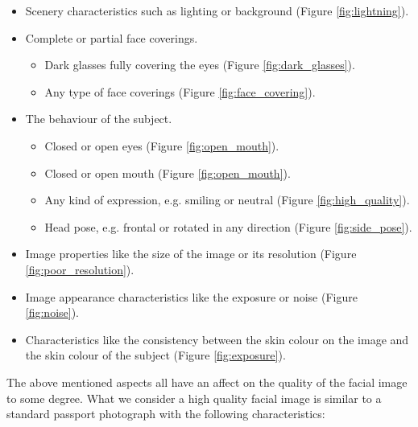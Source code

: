 \begin{itemize}
    \item Scenery characteristics such as lighting or background (Figure \ref{fig:lightning}).
    \item Complete or partial face coverings.
    \begin{itemize}
        \item Dark glasses fully covering the eyes (Figure \ref{fig:dark_glasses}).
        \item Any type of face coverings (Figure \ref{fig:face_covering}).
    \end{itemize}
    \item The behaviour of the subject.
    \begin{itemize}
        \item Closed or open eyes (Figure \ref{fig:open_mouth}).
        \item Closed or open mouth (Figure \ref{fig:open_mouth}).
        \item Any kind of expression, e.g. smiling or neutral (Figure \ref{fig:high_quality}).
        \item Head pose, e.g. frontal or rotated in any direction (Figure \ref{fig:side_pose}).
    \end{itemize}
    \item Image properties like the size of the image or its resolution (Figure \ref{fig:poor_resolution}).
    \item Image appearance characteristics like the exposure or noise (Figure \ref{fig:noise}).
    \item Characteristics like the consistency between the skin colour on the image and the skin colour of the subject (Figure \ref{fig:exposure}).
\end{itemize}
%
The above mentioned aspects all have an affect on the quality of the facial image to some degree. What we consider a high quality facial image is similar to a standard passport photograph with the following characteristics: 
